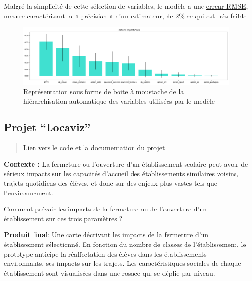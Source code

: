 \documentclass[]{book}
\begin{document}
Malgré la simplicité de cette sélection de variables, le modèle a une
\href{https://fr.wikipedia.org/wiki/Erreur_quadratique_moyenne}{erreur
RMSE}, mesure caractérisant la « précision » d'un estimateur, de 2\% ce
qui est très faible.

\begin{figure}

{\centering \includegraphics[width=1\linewidth]{./img/model-vars} 

}

\caption{Représentation sous forme de boite à moustache de la hiérarchisation automatique des variables utilisées par le modèle}\label{fig:unnamed-chunk-4}
\end{figure}

\subsection{\texorpdfstring{Projet
``Locaviz''}{Projet Locaviz}}\label{projet-locaviz}

\begin{quote}
\href{https://drive.google.com/file/d/1gpl02y7FG4hOCEh2t55YRlaRyTP010Pj/view?usp=sharing}{Lien
vers le code et la documentation du projet}
\end{quote}

\textbf{Contexte :} La fermeture ou l'ouverture d'un établissement
scolaire peut avoir de sérieux impacts sur les capacités d'accueil des
établissements similaires voisins, trajets quotidiens des élèves, et
donc sur des enjeux plus vastes tels que l'environnement.

Comment prévoir les impacts de la fermeture ou de l'ouverture d'un
établissement sur ces trois paramètres ?

\textbf{Produit final}: Une carte décrivant les impacts de la fermeture
d'un établissement sélectionné. En fonction du nombre de classes de
l'établissement, le prototype anticipe la réaffectation des élèves dans
les établissements environnants, ses impacts sur les trajets. Les
caractéristiques sociales de chaque établissement sont visualisées dans
une rosace qui se déplie par niveau.
\end{document}
